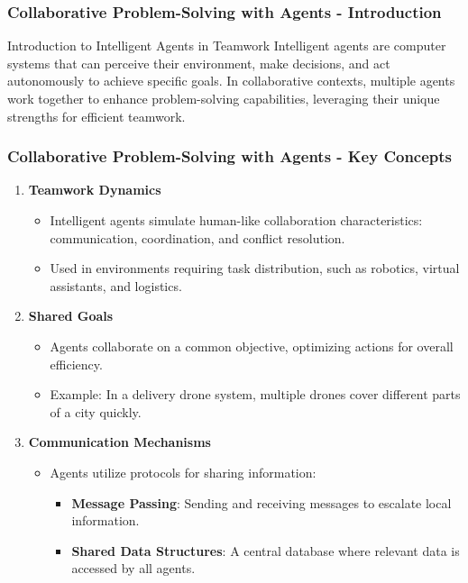 \documentclass[aspectratio=169]{beamer}
\begin{document}
\begin{frame}[fragile]
    \frametitle{Collaborative Problem-Solving with Agents - Introduction}
    \begin{block}{Introduction to Intelligent Agents in Teamwork}
        Intelligent agents are computer systems that can perceive their environment, make decisions, and act autonomously to achieve specific goals. In collaborative contexts, multiple agents work together to enhance problem-solving capabilities, leveraging their unique strengths for efficient teamwork.
    \end{block}
\end{frame}

\begin{frame}[fragile]
    \frametitle{Collaborative Problem-Solving with Agents - Key Concepts}
    \begin{enumerate}
        \item \textbf{Teamwork Dynamics}
        \begin{itemize}
            \item Intelligent agents simulate human-like collaboration characteristics: communication, coordination, and conflict resolution.
            \item Used in environments requiring task distribution, such as robotics, virtual assistants, and logistics.
        \end{itemize}
        
        \item \textbf{Shared Goals}
        \begin{itemize}
            \item Agents collaborate on a common objective, optimizing actions for overall efficiency.
            \item Example: In a delivery drone system, multiple drones cover different parts of a city quickly.
        \end{itemize}
        
        \item \textbf{Communication Mechanisms}
        \begin{itemize}
            \item Agents utilize protocols for sharing information:
            \begin{itemize}
                \item \textbf{Message Passing}: Sending and receiving messages to escalate local information.
                \item \textbf{Shared Data Structures}: A central database where relevant data is accessed by all agents.
            \end{itemize}
        \end{itemize}
    \end{enumerate}
\end{frame}
\end{document}
